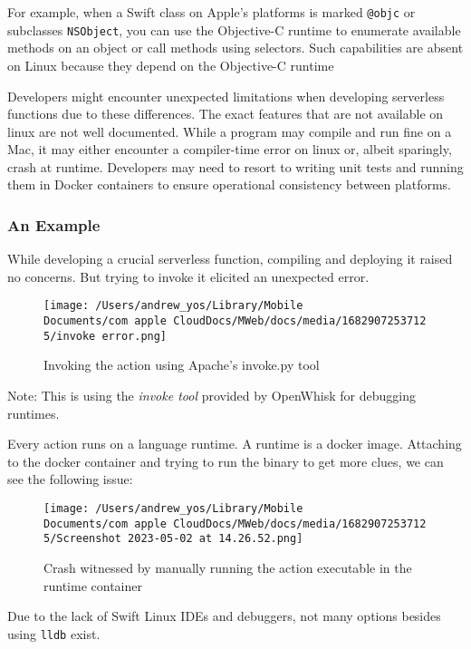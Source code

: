 For example, when a Swift class on Apple’s platforms is marked \texttt{@objc} or subclasses \texttt{NSObject}, you can use the Objective-C runtime to enumerate available methods on an object or call methods using selectors. Such capabilities are absent on Linux because they depend on the Objective-C runtime

Developers might encounter unexpected limitations when developing serverless functions due to these differences. The exact features that are not available on linux are not well documented. While a program may compile and run fine on a Mac, it may either encounter a compiler-time error on linux or, albeit sparingly, crash at runtime. Developers may need to resort to writing unit tests and running them in Docker containers to ensure operational consistency between platforms.

\subsubsection{An Example}

While developing a crucial serverless function, compiling and deploying it raised no concerns. But trying to invoke it elicited an unexpected error.

\begin{figure}[h]
    \centering
    \texttt{[image: /Users/andrew\_yos/Library/Mobile Documents/com~apple~CloudDocs/MWeb/docs/media/16829072537125/invoke error.png]}
    \caption{Invoking the action using Apache's invoke.py tool}
\end{figure}

\noindent Note: This is using the \textit{invoke tool}
 provided by OpenWhisk for debugging runtimes.

Every action runs on a language runtime. A runtime is a docker image. Attaching to the docker container and trying to run the binary to get more clues, we can see the following issue:

\begin{figure}[h]
    \centering
    \texttt{[image: /Users/andrew\_yos/Library/Mobile Documents/com~apple~CloudDocs/MWeb/docs/media/16829072537125/Screenshot 2023-05-02 at 14.26.52.png]}
    \caption{Crash witnessed by manually running the action executable in the runtime container}
\end{figure}

Due to the lack of Swift Linux IDEs and debuggers, not many options besides using \texttt{lldb} exist.

